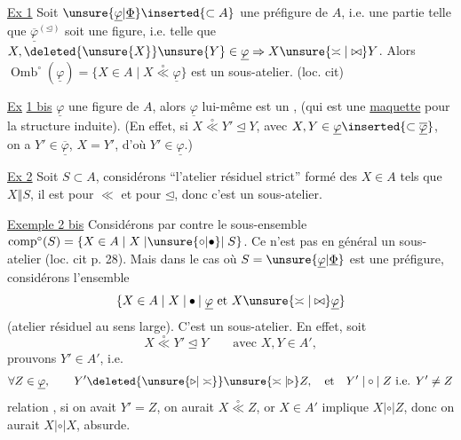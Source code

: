 \uline{Ex 1} Soit \unsure{\textsuperscript{*}} $\unsure{\underline{\varphi}|\underline{\Phi}}\inserted{\subset A}$ une préfigure de $A$, i.e. une partie telle que $\overline{\underline{\varphi}}^{(\unlhd)}$ soit une figure, i.e. telle que $X,\deleted{\unsure{X}}\unsure{Y}\in\underline{\varphi}\Rightarrow X\unsure{\asymp|\bowtie}Y$. Alors $\operatorname{Omb}^{\circ}(\underline{\varphi})=\{X\in A\mid X\overset{\circ}{\ll}\underline{\varphi}\}$ est un sous-atelier. (loc. cit)

\uline{Ex} \uline{1 bis} $\underline{\varphi}$ une figure de $A$, alors $\underline{\varphi}$ lui-même\inserted{!} est un , (qui est une \uline{maquette} pour la structure induite). (En effet, si $X\overset{\circ}{\ll}Y'\unlhd Y$, avec $X,Y\in\underline{\varphi}\inserted{\subset\overline{\underline{\varphi}}}$, on a $Y'\in\overline{\underline{\varphi}}$,  $X=Y'$, d'où $Y'\in\underline{\varphi}$.)

\uline{Ex 2} Soit $S\subset A$, considérons ``l'atelier résiduel strict'' formé des $X\in A$ tels que $X\mathrel{\Vert}S$, il est   pour $\ll$ et  pour $\unlhd$, donc c'est un sous-atelier.

\uline{Exemple 2 bis} Considérons par contre le sous-ensemble $\operatorname{comp}^{\circ}(S)=\{X\in A\mid X\mathrel{|\unsure{\circ|\bullet}|}S\}$. Ce n'est pas en général un sous-atelier (loc. cit p. 28). Mais dans le cas où $S=\unsure{\underline{\varphi}|\underline{\Phi}}$ est une préfigure, considérons l'ensemble 
\[
\{X\in A\mid X\mathrel{|\bullet|}\underline{\varphi}\ \text{et}\ X\unsure{\asymp|\bowtie}\underline{\varphi}\}
\]
(atelier résiduel au sens large). C'est un sous-atelier. En effet, soit
\[
X\overset{\circ}{\ll}Y'\unlhd Y\qquad\text{avec }X,Y\in A',
\]
prouvons $Y'\in A'$, i.e.
\[
\forall Z\in\underline{\varphi},\qquad Y'\deleted{\unsure{\triangleright|\asymp}}\unsure{\asymp|\triangleright}Z,\quad\text{et}\quad Y'\mathrel{|\circ|}Z\ \text{i.e. }Y'\ne Z
\]
 relation ,  si on avait $Y'=Z$, on aurait $X\overset{\circ}{\ll}Z$, or $X\in A'$ implique $X\mathrel{|\circ|}Z$, donc on aurait $X\mathrel{|\circ|}X$, absurde.

